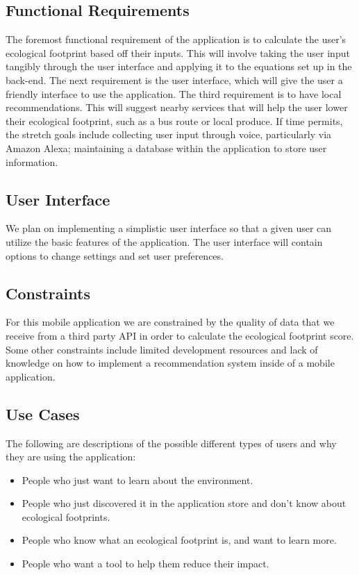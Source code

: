 \documentclass[onecolumn, draftclsnofoot,10pt, compsoc, tikz]{IEEEtran}
\begin{document}
\subsection{Functional Requirements}
The foremost functional requirement of the application is to calculate the user's ecological footprint based off their inputs. This will involve taking the user input tangibly through the user interface and applying it to the equations set up in the back-end. The next requirement is the user interface, which will give the user a friendly interface to use the application. The third requirement is to have local recommendations. This will suggest nearby services that will help the user lower their ecological footprint, such as a bus route or local produce. If time permits, the stretch goals include collecting user input through voice, particularly via Amazon Alexa; maintaining a database within the application to store user information.

\clearpage

\subsection{User Interface}
We plan on implementing a simplistic user interface so that a given user can utilize the basic features of the application. The user interface will contain options to change settings and set user preferences. 

\subsection{Constraints}
For this mobile application we are constrained by the quality of data that we receive from a third party API in order to calculate the ecological footprint score. Some other constraints include limited development resources and lack of knowledge on how to implement a recommendation system inside of a mobile application. 

\subsection{Use Cases}
The following are descriptions of the possible different types of users and why they are using the application: \\
\begin{itemize}
  \item People who just want to learn about the environment. 
  \item People who just discovered it in the application store and don't know about ecological footprints.
  \item People who know what an ecological footprint is, and want to learn more.
  \item People who want a tool to help them reduce their impact. \\
\end{itemize} 
\end{document}
